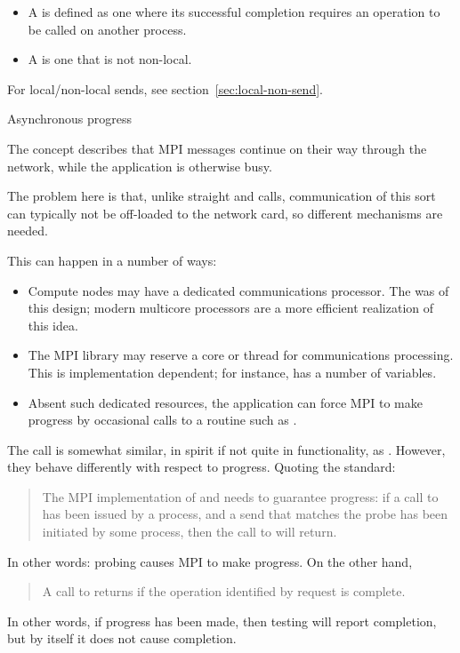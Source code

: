 \begin{itemize}
\item A %
  is defined as one
  where its successful completion requires an operation to be called
  on another process.
\item A  is one that is not non-local.
\end{itemize}

For local/non-local sends, see section~\ref{sec:local-non-send}.

 {Asynchronous progress}
\label{sec:progress}

The concept  describes
that MPI messages continue on their way through the network,
while the application is otherwise busy.

The problem here is that, unlike straight  and
 calls,
communication of this sort can 
typically not be off-loaded to the network card, so different
mechanisms are needed.

This can happen in a number of ways:
\begin{itemize}
\item Compute nodes may have a dedicated communications processor. The
   was of this design; modern
  multicore processors are a more efficient realization of this idea.
\item The MPI library may reserve a core or thread for communications
  processing. This is implementation dependent; for instance,
   has a number of
   variables.
\item Absent such dedicated resources, the application can force MPI
  to make progress by occasional calls to a 
  routine such as .
\end{itemize}

\begin{remark}
  The  call is somewhat similar,
  in spirit if not quite in functionality,
  as . However, they behave differently with respect to progress.
  Quoting the standard:
  \begin{quote}
    The MPI implementation of  and
     needs to guarantee progress: if a call
    to  has been issued by a process, and a send that matches
    the probe has been initiated by some process, then the call to
     will return.
  \end{quote}
  In other words: probing causes MPI to make progress.
  On the other hand,
  \begin{quote}
    A call to  returns 
    if the operation identified by request is complete.
  \end{quote}
  In other words, if progress has been made, then testing will report completion,
  but by itself it does not cause completion.
\end{remark}

